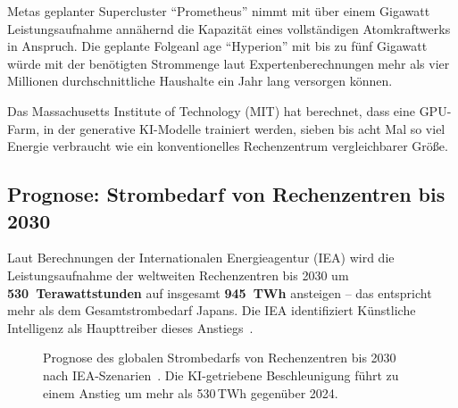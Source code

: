 \documentclass[12pt, a4paper, openany]{report}
\begin{document}
\noindent
Metas geplanter Supercluster ``Prometheus'' nimmt mit über einem Gigawatt
Leistungsaufnahme annähernd die Kapazität eines vollständigen Atomkraftwerks
in Anspruch. Die geplante Folgeanl age ``Hyperion'' mit bis zu fünf Gigawatt
würde mit der benötigten Strommenge laut Expertenberechnungen mehr als vier
Millionen durchschnittliche Haushalte ein Jahr lang versorgen können.

Das Massachusetts Institute of Technology (MIT) hat berechnet, dass eine
GPU-Farm, in der generative KI-Modelle trainiert werden, sieben bis acht
Mal so viel Energie verbraucht wie ein konventionelles Rechenzentrum
vergleichbarer Größe.

\subsection{Prognose: Strombedarf von Rechenzentren bis 2030}

Laut Berechnungen der Internationalen Energieagentur (IEA) wird die
Leistungsaufnahme der weltweiten Rechenzentren bis 2030 um
\textbf{530~Terawattstunden} auf insgesamt \textbf{945~TWh} ansteigen --
das entspricht mehr als dem Gesamtstrombedarf Japans. Die IEA identifiziert
Künstliche Intelligenz als Haupttreiber dieses Anstiegs~\cite{iea2024}.

\begin{figure}[H]
	\centering
	\caption{Prognose des globalen Strombedarfs von Rechenzentren bis 2030
		nach IEA-Szenarien~\cite{iea2024}. Die KI-getriebene Beschleunigung
		führt zu einem Anstieg um mehr als 530\,TWh gegenüber 2024.}
	\label{fig:iea_prognose}
\end{figure}
\end{document}
